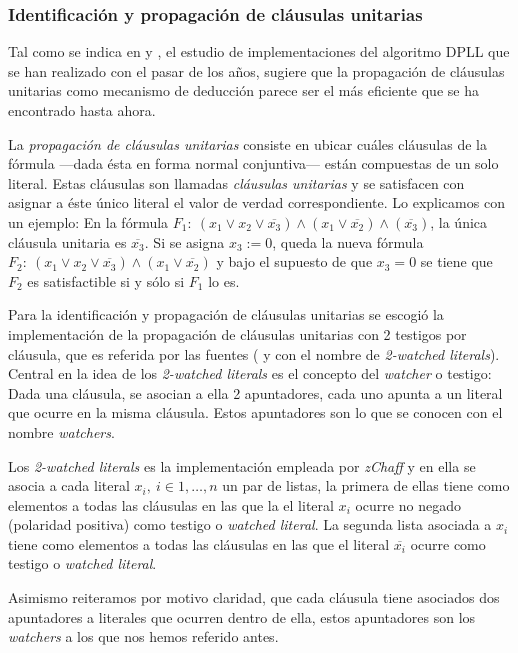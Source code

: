 \documentclass[12pt,lettersize,oneside]{article}
\begin{document}
\subsubsection{Identificación y propagación de cláusulas
  unitarias}\label{UnitPropagation}
Tal como se indica en \cite{Zhang} y \cite{ZhangThesis}, el estudio de
implementaciones del algoritmo DPLL que se han realizado con el pasar de los
años, sugiere que la propagación de cláusulas unitarias como mecanismo de
deducción parece ser el más eficiente que se ha encontrado hasta ahora.

La \emph{propagación de cláusulas unitarias} consiste en ubicar cuáles cláusulas
de la fórmula ---dada ésta en forma normal conjuntiva--- están compuestas de un
solo literal. Estas cláusulas son llamadas \emph{cláusulas unitarias} y se
satisfacen con asignar a éste único literal el valor de verdad correspondiente.
Lo explicamos con un ejemplo: En la fórmula $F_1:\ (x_1 \vee x_2 \vee
\overline{x_3}) \wedge (x_1 \vee \overline{x_2}) \wedge (\overline{x_3})$, la
única cláusula unitaria es $\overline{x_3}$. Si se asigna $x_3:=0$, queda la
nueva fórmula $F_2:\ (x_1 \vee x_2 \vee \overline{x_3}) \wedge (x_1 \vee
\overline{x_2}) $ y bajo el supuesto de que $x_3=0$ se tiene que $F_2$ es
satisfactible si y sólo si $F_1$ lo es.

Para la identificación y propagación de cláusulas unitarias se escogió la
implementación de la propagación de cláusulas unitarias con 2 testigos por
cláusula, que es referida por las fuentes (\cite{Zhang} y \cite{ZhangThesis} con
el nombre de \emph{2-watched literals}). Central en la idea de los
\emph{2-watched literals} es el concepto del \emph{watcher} o testigo: Dada una
cláusula, se asocian a ella 2 apuntadores, cada uno apunta a un literal que
ocurre en la misma cláusula. Estos apuntadores son lo que se conocen con el
nombre \emph{watchers}.

Los \emph{2-watched literals} es la implementación empleada por \emph{zChaff} y 
en ella se asocia a cada literal $x_i,\ i\in{1,\ldots,n}$ un par de listas, la
primera de ellas tiene como elementos a todas las cláusulas en las que la el
literal $x_i$ ocurre no negado (polaridad positiva) como testigo o \emph{watched
  literal}. La segunda lista asociada a $x_i$ tiene como elementos a todas las
cláusulas en las que el literal $\overline{x_i}$ ocurre como testigo o
\emph{watched literal}.

Asimismo reiteramos por motivo claridad, que cada cláusula tiene asociados dos
apuntadores a literales que ocurren dentro de ella, estos apuntadores son los
\emph{watchers} a los que nos hemos referido antes.
\end{document}
